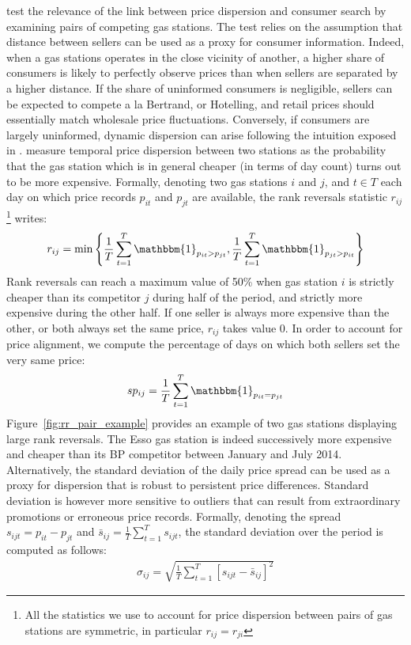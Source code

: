 \documentclass[english]{article}
\begin{document}
\cite{TAP11} test the relevance of the link between price dispersion and consumer search by examining pairs of competing gas stations. The test relies on the assumption that distance between sellers can be used as a proxy for consumer information. Indeed, when a gas stations operates in the close vicinity of another, a higher share of consumers is likely to perfectly observe prices than when sellers are separated by a higher distance. If the share of uninformed consumers is negligible, sellers can be expected to compete a la Bertrand, or Hotelling, and retail prices should essentially match wholesale price fluctuations. Conversely, if consumers are largely uninformed, dynamic dispersion can arise following the intuition exposed in \cite{VAR80}. \cite{TAP11} measure temporal price dispersion between two stations as the probability that the gas station which is in general cheaper (in terms of day count) turns out to be more expensive. Formally, denoting two gas stations $i$ and $j$, and $t \in T$ each day on which price records $p_{it}$ and $p_{jt}$ are available, the rank reversals statistic $r_{ij}$%
\footnote{All the statistics we use to account for price dispersion between pairs of gas stations are symmetric, in particular $r_{ij} = r_{ji}$}%
writes:
\begin{align*}
r_{ij} = \min\left\{\frac{1}{T} \sum_{t=1}^{T} \mathbbm{1}_{p_{it} > p_{jt}}, \frac{1}{T} \sum_{t=1}^{T} \mathbbm{1}_{p_{jt} > p_{it}}\right\}
\end{align*}
Rank reversals can reach a maximum value of 50\% when gas station $i$ is strictly cheaper than its competitor $j$ during half of the period, and strictly more expensive during the other half. If one seller is always more expensive than the other, or both always set the same price, $r_{ij}$ takes value 0. In order to account for price alignment, we compute the percentage of days on which both sellers set the very same price:
\begin{align*}
sp_{ij} = \frac{1}{T} \sum_{t=1}^{T} \mathbbm{1}_{p_{it} = p_{jt}}
\end{align*}
Figure~\ref{fig:rr_pair_example} provides an example of two gas stations displaying large rank reversals. The Esso gas station is indeed successively more expensive and cheaper than its BP competitor between January and July 2014. Alternatively, the standard deviation of the daily price spread can be used as a proxy for dispersion that is robust to persistent price differences. Standard deviation is however more sensitive to outliers that can result from extraordinary promotions or erroneous price records. Formally, denoting the spread $s_{ijt} = p_{it} - p_{jt}$ and $\bar{s}_{ij} = \frac{1}{T} \sum_{t=1}^{T} s_{ijt}$, the standard deviation over the period is computed as follows:
\begin{align*}
\sigma_{ij} = \sqrt{\frac{1}{T} \sum_{t=1}^{T} [s_{ijt} - \bar{s}_{ij}]^2}
\end{align*}
\end{document}
